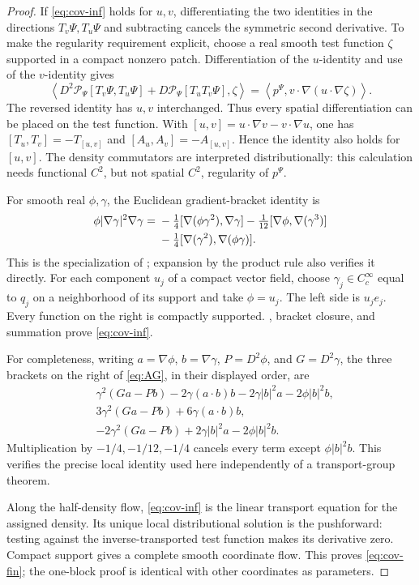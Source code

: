 \documentclass[11pt]{article}
\numberwithin{equation}{section}
\theoremstyle{definition}
\newcommand{\Cc}{C_c^\infty}
\newcommand{\Pcal}{\mathcal P}
\begin{document}
\begin{proof}
If \eqref{eq:cov-inf} holds for \(u,v\), differentiating the two identities in the directions \(T_v\Psi,T_u\Psi\) and subtracting cancels the symmetric second derivative. To make the regularity requirement explicit, choose a real smooth test function \(\zeta\) supported in a compact nonzero patch. Differentiation of the \(u\)-identity and use of the \(v\)-identity gives
\[
 \left\langle D^2\Pcal_\Psi[T_v\Psi,T_u\Psi]+D\Pcal_\Psi[T_uT_v\Psi],\zeta\right\rangle
 =\left\langle p^\Psi,v\cdot\nabla(u\cdot\nabla\zeta)\right\rangle.
\]
The reversed identity has \(u,v\) interchanged. Thus every spatial differentiation can be placed on the test function. With
\([u,v]=u\cdot\nabla v-v\cdot\nabla u\), one has
\([T_u,T_v]=-T_{[u,v]}\) and \([A_u,A_v]=-A_{[u,v]}\).
Hence the identity also holds for \([u,v]\). The density commutators are interpreted distributionally: this calculation needs functional \(C^2\), but not spatial \(C^2\), regularity of \(p^\Psi\).

For smooth real \(\phi,\gamma\), the Euclidean gradient-bracket identity is
\begin{align}
 \phi|\nabla\gamma|^2\nabla\gamma
 ={}&-\tfrac14[\nabla(\phi\gamma^2),\nabla\gamma]
     -\tfrac1{12}[\nabla\phi,\nabla(\gamma^3)] \notag\\
 &-\tfrac14[\nabla(\gamma^2),\nabla(\phi\gamma)].
 \label{eq:AG}
\end{align}
This is the specialization of \cite[Proposition 1, equation (10)]{AG2026}; expansion by the product rule also verifies it directly. For each component \(u_j\) of a compact vector field, choose \(\gamma_j\in\Cc\) equal to \(q_j\) on a neighborhood of its support and take \(\phi=u_j\). The left side is \(u_j e_j\). Every function on the right is compactly supported. , bracket closure, and summation prove \eqref{eq:cov-inf}.

For completeness, writing \(a=\nabla\phi\), \(b=\nabla\gamma\), \(P=D^2\phi\), and \(G=D^2\gamma\), the three brackets on the right of \eqref{eq:AG}, in their displayed order, are
\begin{align*}
 &\gamma^2(Ga-Pb)-2\gamma(a\cdot b)b-2\gamma|b|^2a-2\phi|b|^2b,\\
 &3\gamma^2(Ga-Pb)+6\gamma(a\cdot b)b,\\
 &-2\gamma^2(Ga-Pb)+2\gamma|b|^2a-2\phi|b|^2b.
\end{align*}
Multiplication by \(-1/4,-1/12,-1/4\) cancels every term except \(\phi|b|^2b\). This verifies the precise local identity used here independently of a transport-group theorem.

Along the half-density flow, \eqref{eq:cov-inf} is the linear transport equation for the assigned density. Its unique local distributional solution is the pushforward: testing against the inverse-transported test function makes its derivative zero. Compact support gives a complete smooth coordinate flow. This proves \eqref{eq:cov-fin}; the one-block proof is identical with other coordinates as parameters.
\end{proof}
\end{document}
